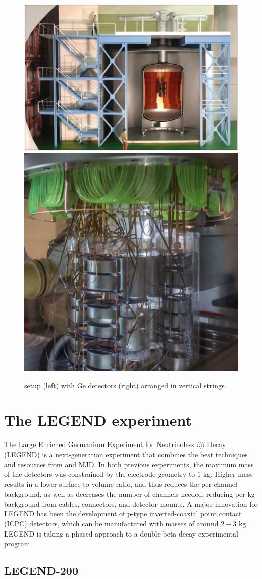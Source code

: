 \begin{figure}
\centering
\includegraphics[height=0.385\columnwidth]{ch2/figs/gerda_setup.pdf}
\qquad
\includegraphics[height=0.385\columnwidth]{ch2/figs/gerdastrings.pdf}
\caption{{\Gerda} setup (left) with Ge detectors (right) arranged in vertical strings.}
\label{ch2_fig_gerda_setup}
\end{figure}
  
\section{The LEGEND experiment}
The Large Enriched Germanium Experiment for Neutrinoless $\beta\beta$ Decay (LEGEND) is a next-generation experiment that combines the best techniques and resources from {\Gerda} and MJD. In both previous experiments, the maximum mass of the detectors was constrained by the electrode geometry to $1$ kg. Higher mass results in a lower surface-to-volume ratio, and thus reduces the per-channel background, as well as decreases the number of channels needed, reducing per-kg background from cables, connectors, and detector mounts. A major innovation for LEGEND has been the development of p-type inverted-coaxial point contact (ICPC) detectors, which can be manufactured with masses of around $2-3$ kg. LEGEND is taking a phased approach to a double-beta decay experimental program.

\subsection{LEGEND-200}

